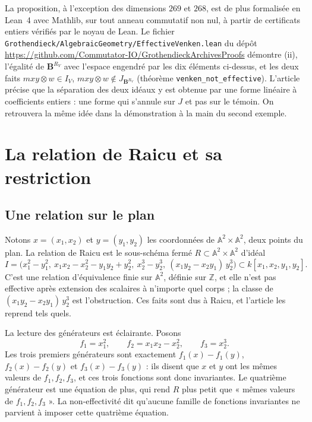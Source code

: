 \documentclass[11pt,a4paper]{amsart}
\theoremstyle{definition}
\theoremstyle{plain}
\theoremstyle{remark}
\newcommand{\A}{\mathbb A}
\newcommand{\Z}{\mathbb Z}
\begin{document}
La proposition, à l'exception des dimensions $269$ et $268$, est de plus formalisée en Lean~4 avec Mathlib, sur tout anneau commutatif non nul, à partir de certificats entiers vérifiés par le noyau de Lean. Le fichier \texttt{Grothendieck/\allowbreak AlgebraicGeometry/\allowbreak EffectiveVenken.lean} du dépôt \url{https://github.com/Commutator-IO/GrothendieckArchivesProofs} démontre (ii), l'égalité de $\mathbf B^{R_V}$ avec l'espace engendré par les dix éléments ci-dessus, et les deux faits $mxy \otimes w \in I_V$, $mxy \otimes w \notin J_{\mathbf B^{R_V}}$ (théorème \texttt{venken\_not\_effective}). L'article précise que la séparation des deux idéaux y est obtenue par une forme linéaire à coefficients entiers : une forme qui s'annule sur $J$ et pas sur le témoin. On retrouvera la même idée dans la démonstration à la main du second exemple.

\section{La relation de Raicu et sa restriction}

\subsection{Une relation sur le plan}

Notons $x = (x_1, x_2)$ et $y = (y_1, y_2)$ les coordonnées de $\A^2 \times \A^2$, deux points du plan. La relation de Raicu est le sous-schéma fermé $R \subset \A^2 \times \A^2$ d'idéal
\[
I = \bigl(x_1^2 - y_1^2,\ x_1x_2 - x_2^2 - y_1y_2 + y_2^2,\ x_2^3 - y_2^3,\ (x_1y_2 - x_2y_1)\,y_2^3\bigr) \subset k[x_1, x_2, y_1, y_2].
\]
C'est une relation d'équivalence finie sur $\A^2$, définie sur $\Z$, et elle n'est pas effective après extension des scalaires à n'importe quel corps ; la classe de $(x_1y_2 - x_2y_1)\,y_2^3$ est l'obstruction. Ces faits sont dus à Raicu, et l'article les reprend tels quels.

La lecture des générateurs est éclairante. Posons
\[
f_1 = x_1^2, \qquad f_2 = x_1x_2 - x_2^2, \qquad f_3 = x_2^3.
\]
Les trois premiers générateurs sont exactement $f_1(x) - f_1(y)$, $f_2(x) - f_2(y)$ et $f_3(x) - f_3(y)$ : ils disent que $x$ et $y$ ont les mêmes valeurs de $f_1, f_2, f_3$, et ces trois fonctions sont donc invariantes. Le quatrième générateur est une équation de plus, qui rend $R$ plus petit que « mêmes valeurs de $f_1, f_2, f_3$ ». La non-effectivité dit qu'aucune famille de fonctions invariantes ne parvient à imposer cette quatrième équation.
\end{document}
